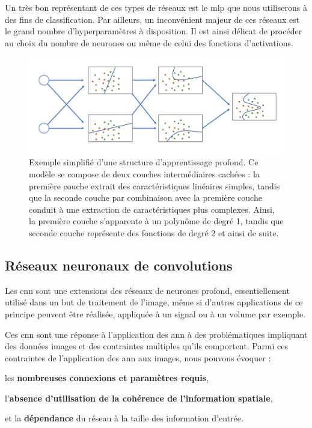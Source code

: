 Un très bon représentant de ces types de réseaux est le \gls{mlp} que nous utiliserons à des fins de classification. Par ailleurs, un inconvénient majeur de ces réseaux est le grand nombre d'hyperparamètres à disposition. Il est ainsi délicat de procéder au choix du nombre de neurones ou même de celui des fonctions d'activations.\par

\addtocounter{footnote}{1}

\begin{figure}[H]
    \centering
    \includegraphics[width=\linewidth]{contents/chapter_3/resources/scheme_deep_understanding.pdf}
    \caption{Exemple simplifié d'une structure d’apprentissage profond. Ce modèle se compose de deux couches intermédiaires cachées : la première couche extrait des caractéristiques linéaires simples, tandis que la seconde couche par combinaison avec la première couche conduit à une extraction de caractéristiques plus complexes. Ainsi, la première couche s'apparente à un polynôme de degré 1, tandis que seconde couche représente des fonctions de degré 2 et ainsi de suite.}
    \label{fig:scheme_deep_understanding}
\end{figure}

\subsection{Réseaux neuronaux de convolutions}
\label{sec:convolutionnal_neural_network}
Les \gls{cnn} sont une extensions des réseaux de neurones profond, essentiellement utilisé dans un but de traitement de l'image, même si d'autres applications de ce principe peuvent être réalisée, appliquée à un signal ou à un volume par exemple.\par

Ces \gls{cnn} sont une réponse à l'application des \gls{ann} à des problématiques impliquant des données images et des contraintes multiples qu'ils comportent. Parmi ces contraintes de l'application des \gls{ann} aux images, nous pouvons évoquer : 
\begin{inlinerate}
\item les \textbf{nombreuses connexions et paramètres requis},
\item l'\textbf{absence d'utilisation de la cohérence de l'information spatiale},
\item et la \textbf{dépendance} du réseau à la taille des information d'entrée.
\end{inlinerate}\par


